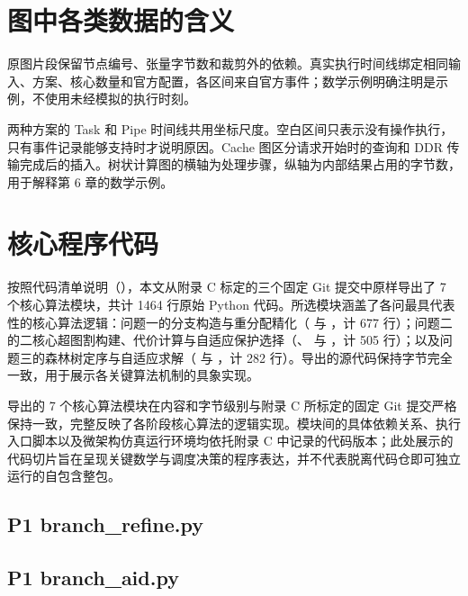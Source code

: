 \documentclass[anonymous,notoc]{gmcm2026}
\begin{document}
\section{图中各类数据的含义}

原图片段保留节点编号、张量字节数和裁剪外的依赖。真实执行时间线绑定相同输入、方案、核心数量和官方配置，各区间来自官方事件；数学示例明确注明是示例，不使用未经模拟的执行时刻。

两种方案的 Task 和 Pipe 时间线共用坐标尺度。空白区间只表示没有操作执行，只有事件记录能够支持时才说明原因。Cache 图区分请求开始时的查询和 DDR 传输完成后的插入。树状计算图的横轴为处理步骤，纵轴为内部结果占用的字节数，用于解释第 6 章的数学示例。

\section{核心程序代码}

按照代码清单说明（\texttt{}），本文从附录 C 标定的三个固定 Git 提交中原样导出了 7 个核心算法模块，共计 1464 行原始 Python 代码。所选模块涵盖了各问最具代表性的核心算法逻辑：问题一的分支构造与重分配精化（\texttt{} 与 \texttt{}，计 677 行）；问题二的二核心超图割构建、代价计算与自适应保护选择（\texttt{}、\texttt{} 与 \texttt{}，计 505 行）；以及问题三的森林树定序与自适应求解（\texttt{} 与 \texttt{}，计 282 行）。导出的源代码保持字节完全一致，用于展示各关键算法机制的具象实现。

导出的 7 个核心算法模块在内容和字节级别与附录 C 所标定的固定 Git 提交严格保持一致，完整反映了各阶段核心算法的逻辑实现。模块间的具体依赖关系、执行入口脚本以及微架构仿真运行环境均依托附录 C 中记录的代码版本；此处展示的代码切片旨在呈现关键数学与调度决策的程序表达，并不代表脱离代码仓即可独立运行的自包含整包。
\subsection{P1 branch\_refine.py}

\subsection{P1 branch\_aid.py}

\end{document}

